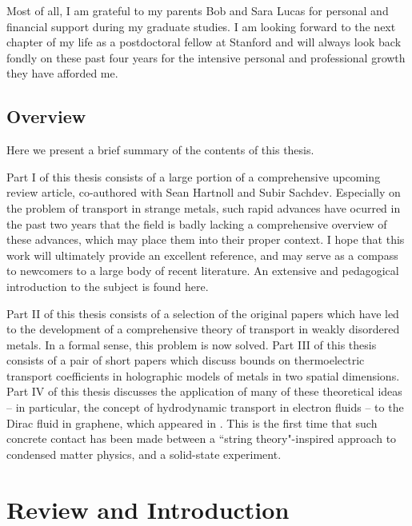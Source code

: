 \documentclass[10pt, oneside]{book}
\begin{document}
\begin{doublespace}
Most of all, I am grateful to my parents Bob and Sara Lucas for personal and financial support during my graduate studies.   I am looking forward to the next chapter of my life as a postdoctoral fellow at Stanford and will always look back fondly on these past four years for the intensive personal and professional growth they have afforded me.

\chapter{Overview}

\renewcommand{\thepage}{\arabic{page}}
\setcounter{page}{1}

Here we present a brief summary of the contents of this thesis.


Part I of this thesis consists of a large portion of a comprehensive upcoming review article, co-authored with Sean Hartnoll and Subir Sachdev.   Especially on the problem of transport in strange metals,  such rapid advances have ocurred in the past two years that the field is badly lacking a comprehensive overview of these advances, which may place them into their proper context.  I hope that this work will ultimately provide an excellent reference, and may serve as a compass to newcomers to a large body of recent literature.      An extensive and pedagogical introduction to the subject is found here. 

Part II of this thesis consists of a selection of the original papers \cite{lucas1401, Lucas:2015vna, Lucas:2015pxa} which have led to the development of a comprehensive theory of transport in weakly disordered metals.    In a formal sense, this problem is now solved.   Part III of this thesis consists of a pair of short papers \cite{Grozdanov:2015qia, Grozdanov2} which discuss bounds on thermoelectric transport coefficients in holographic models of metals in two spatial dimensions.    Part IV of this thesis discusses the application of many of these theoretical ideas -- in particular, the concept of hydrodynamic transport in electron fluids -- to the Dirac fluid in graphene, which appeared in \cite{Crossno1058, Lucas:2015sya}.    This is the first time that such concrete contact has been made between a ``string theory"-inspired approach to condensed matter physics,  and a solid-state experiment.




\part{Review and Introduction}



\end{doublespace}
\end{document}
